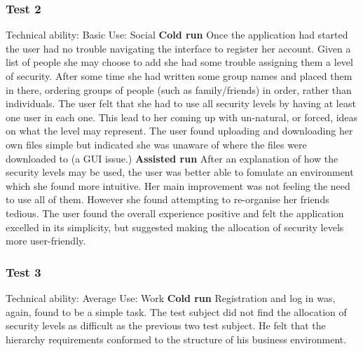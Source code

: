 \documentclass[12pt, titlepage]{article}
\begin{document}
\subsubsection{Test 2}
Technical ability: Basic
\newline Use: Social
\newline
\newline \textbf{Cold run}
\newline Once the application had started the user had no trouble navigating the interface to register her account. Given a list of people she may choose to add she had some trouble assigning them a level of security. After some time she had written some group names and placed them in there, ordering groups of people (such as family/friends) in order, rather than individuals. The user felt that she had to use all security levels by having at least one user in each one. This lead to her coming up with un-natural, or forced, ideas on what the level may represent.
\newline \indent The user found uploading and downloading her own files simple but indicated she was unaware of where the files were downloaded to (a GUI issue.)
\newline
\newline \textbf{Assisted run}
\newline After an explanation of how the security levels may be used, the user was better able to fomulate an environment which she found more intuitive. Her main improvement was not feeling the need to use all of them. However she found attempting to re-organise her friends tedious.
\newline
\newline The user found the overall experience positive and felt the application excelled in its simplicity, but suggested making the allocation of security levels more user-friendly.

\subsubsection{Test 3}
Technical ability: Average
\newline Use: Work
\newline
\newline \textbf{Cold run}
\newline Registration and log in was, again, found to be a simple task. The test subject did not find the allocation of security levels as difficult as the previous two test subject. He felt that the hierarchy requirements conformed to the structure of his business environment.
\end{document}
